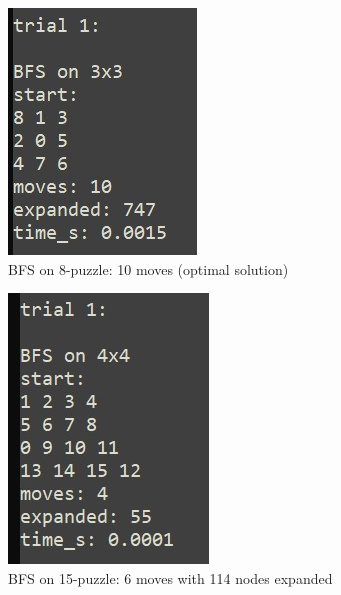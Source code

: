 \documentclass[letterpaper]{article}
\begin{document}
\begin{figure}[h]
\centering
\includegraphics[width=0.85\columnwidth]{bfs_3x3.jpg}
\caption{BFS on 8-puzzle: 10 moves (optimal solution)}
\end{figure}

\begin{figure}[h]
\centering
\includegraphics[width=0.85\columnwidth]{bfs_4x4.jpg}
\caption{BFS on 15-puzzle: 6 moves with 114 nodes expanded}
\end{figure}
\end{document}
